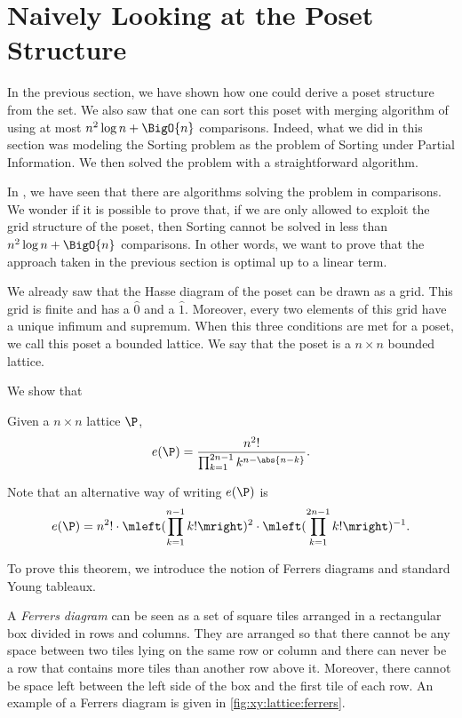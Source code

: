 \section{Naively Looking at the Poset Structure}
\label{tree:xy:grid}

In the previous section, we have shown how one could derive a poset structure
from the \XY set. We also saw that one can sort this \XY poset with
merging algorithm of 
using at most \(n^2 \log n + \BigO{n}\) comparisons. Indeed, what we
did in this section was modeling the Sorting \XY problem as the problem of
Sorting under Partial Information. We then solved the problem with a
straightforward algorithm.

In , we have seen that there are algorithms solving the \SUPI
problem in  comparisons. We wonder if it is possible to prove
that, if we are only allowed to exploit the grid structure of the \XY poset,
then Sorting \XY cannot be solved in less than \(n^2 \log n + \BigO{n}\)
comparisons. In other words, we want to prove that the approach taken in the
previous section is optimal up to a linear term.

We already saw that the Hasse diagram of the poset \XY can be drawn as a grid.
This grid is finite and has a \(\hat{0}\) and a \(\hat{1}\). Moreover, every
two elements of this grid have a unique infimum and supremum. When this three
conditions are met for a poset, we call this poset a bounded lattice. We say
that the poset \XY is a \( n \times n \) bounded lattice.

We show that
\begin{theorem}
Given a \( n \times n \) lattice \(\P\),
\begin{displaymath}
e(\P) = \frac{n^2!}{\prod_{k=1}^{2n-1} k^{n - \abs{n-k}}}.
\end{displaymath}
\end{theorem}
Note that an alternative way of writing \(e(\P)\) is
\begin{displaymath}
e(\P) = n^2! \cdot \mleft(\prod_{k=1}^{n-1} k!\mright)^2 \cdot
\mleft(\prod_{k=1}^{2n-1} k!\mright)^{-1}.
\end{displaymath}

To prove this theorem, we introduce the notion of Ferrers diagrams and standard Young tableaux.

A \emph{Ferrers diagram} can be seen as a set of square tiles arranged in a
rectangular
box divided in rows and columns. They are arranged so that there cannot be any space between two tiles
lying on the same row or column and there can never be a row that contains more
tiles than another row above it. Moreover, there cannot be space left between
the left side of the box and the first tile of each row. An example of a
Ferrers diagram is given in \ref{fig:xy:lattice:ferrers}.

